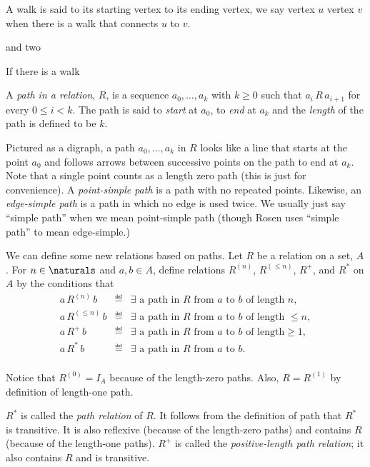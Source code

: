 A walk is said to  its starting vertex to its ending vertex,
we say vertex $u$  vertex $v$ when there is a walk
that connects $u$ to $v$.


and two 

If there is a walk 

\begin{definition}
A \emph{path in a relation}, $R$, is a sequence $a_0,\dots,a_k$ with $k \ge
0$ such that $a_i\, R\, a_{i+1}$ for every $0 \le i < k$.  The path is
said to \emph{start} at $a_0$, to \emph{end} at $a_k$ and the
\emph{length} of the path is defined to be $k$.
\end{definition}

Pictured as a digraph, a path $a_0,\dots,a_k$ in $R$ looks like a line
that starts at the point $a_0$ and follows arrows between successive
points on the path to end at $a_k$.  Note that a single point counts as a
length zero path (this is just for convenience).  A \emph{point-simple
path} is a path with no repeated points.  Likewise, an \emph{edge-simple
path} is a path in which no edge is used twice.  We usually just say
``simple path'' when we mean point-simple path (though Rosen uses ``simple
path'' to mean edge-simple.)




We can define some new relations based on paths.  Let $R$ be a relation on
a set, $A$.  For $n \in \naturals$ and $a,b \in A$, define relations
$R^{(n)}$, $R^{(\le n)}$, $R^+$, and $R^*$ on $A$ by the conditions that
\begin{eqnarray*}
a\, R^{(n)}\, b &\eqdef& \exists\mbox{ a path in $R$ from $a$ to $b$ of length $n$},\\
a\, R^{(\le n)}\, b &\eqdef& \exists\mbox{ a path in $R$ from $a$ to $b$ of
length $\le n$},\\
a\, R^+\, b &\eqdef& \exists\mbox{ a path in $R$ from $a$ to $b$ of length
$\ge 1$},\\
a\, R^*\, b &\eqdef& \exists\mbox{ a path in $R$ from $a$ to $b$}.\\
\end{eqnarray*}

Notice that $R^{(0)} = I_A$ because of the length-zero paths.  Also, $R =
R^{(1)}$ by definition of length-one path.

$R^*$ is called the \emph{path relation} of $R$.  It follows from the
definition of path that $R^*$ is transitive.  It is also reflexive (because
of the length-zero paths) and contains $R$ (because of the length-one
paths).  $R^+$ is called the \emph{positive-length path relation}; it also
contains $R$ and is transitive.



